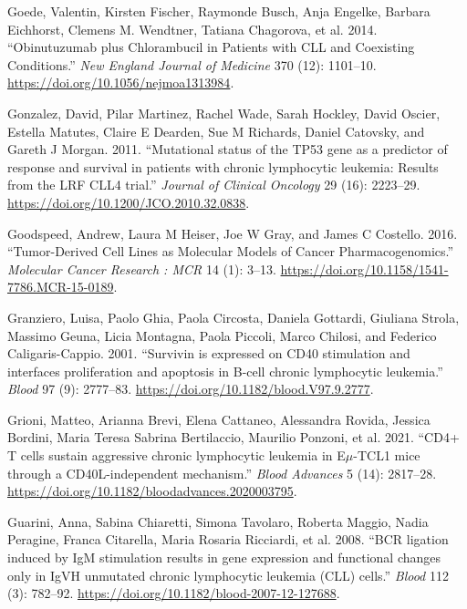 \documentclass[11pt, a4paper, twosided]{book}
\newenvironment{CSLReferences}%
  {}%
  {\par}
\begin{document}
\begin{CSLReferences}{1}{0}
\leavevmode{}%
Goede, Valentin, Kirsten Fischer, Raymonde Busch, Anja Engelke, Barbara Eichhorst, Clemens M. Wendtner, Tatiana Chagorova, et al. 2014. {``{Obinutuzumab plus Chlorambucil in Patients with CLL and Coexisting Conditions}.''} \emph{New England Journal of Medicine} 370 (12): 1101--10. \url{https://doi.org/10.1056/nejmoa1313984}.

\leavevmode{}%
Gonzalez, David, Pilar Martinez, Rachel Wade, Sarah Hockley, David Oscier, Estella Matutes, Claire E Dearden, Sue M Richards, Daniel Catovsky, and Gareth J Morgan. 2011. {``{Mutational status of the TP53 gene as a predictor of response and survival in patients with chronic lymphocytic leukemia: Results from the LRF CLL4 trial}.''} \emph{Journal of Clinical Oncology} 29 (16): 2223--29. \url{https://doi.org/10.1200/JCO.2010.32.0838}.

\leavevmode{}%
Goodspeed, Andrew, Laura M Heiser, Joe W Gray, and James C Costello. 2016. {``{Tumor-Derived Cell Lines as Molecular Models of Cancer Pharmacogenomics.}''} \emph{Molecular Cancer Research : MCR} 14 (1): 3--13. \url{https://doi.org/10.1158/1541-7786.MCR-15-0189}.

\leavevmode{}%
Granziero, Luisa, Paolo Ghia, Paola Circosta, Daniela Gottardi, Giuliana Strola, Massimo Geuna, Licia Montagna, Paola Piccoli, Marco Chilosi, and Federico Caligaris-Cappio. 2001. {``{Survivin is expressed on CD40 stimulation and interfaces proliferation and apoptosis in B-cell chronic lymphocytic leukemia}.''} \emph{Blood} 97 (9): 2777--83. \url{https://doi.org/10.1182/blood.V97.9.2777}.

\leavevmode{}%
Grioni, Matteo, Arianna Brevi, Elena Cattaneo, Alessandra Rovida, Jessica Bordini, Maria Teresa Sabrina Bertilaccio, Maurilio Ponzoni, et al. 2021. {``{CD4+ T cells sustain aggressive chronic lymphocytic leukemia in E\(\mu\)-TCL1 mice through a CD40L-independent mechanism}.''} \emph{Blood Advances} 5 (14): 2817--28. \url{https://doi.org/10.1182/bloodadvances.2020003795}.

\leavevmode{}%
Guarini, Anna, Sabina Chiaretti, Simona Tavolaro, Roberta Maggio, Nadia Peragine, Franca Citarella, Maria Rosaria Ricciardi, et al. 2008. {``{BCR ligation induced by IgM stimulation results in gene expression and functional changes only in IgVH unmutated chronic lymphocytic leukemia (CLL) cells}.''} \emph{Blood} 112 (3): 782--92. \url{https://doi.org/10.1182/blood-2007-12-127688}.


\end{CSLReferences}
\end{document}
